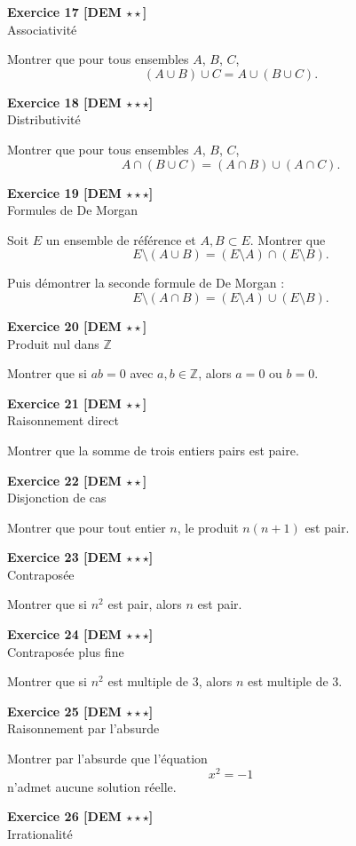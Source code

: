 \documentclass[11pt,a4paper]{article}
\newcommand{\Z}{\mathbb{Z}}
\begin{document}
\textbf{Exercice 17 [DEM \(\star\star\)]}\\
Associativité

Montrer que pour tous ensembles \(A\), \(B\), \(C\),
\[
(A\cup B)\cup C=A\cup(B\cup C).
\]

\textbf{Exercice 18 [DEM \(\star\star\star\)]}\\
Distributivité

Montrer que pour tous ensembles \(A\), \(B\), \(C\),
\[
A\cap(B\cup C)=(A\cap B)\cup(A\cap C).
\]

\textbf{Exercice 19 [DEM \(\star\star\star\)]}\\
Formules de De Morgan

Soit \(E\) un ensemble de référence et \(A,B\subset E\). Montrer que
\[
E\setminus(A\cup B)=(E\setminus A)\cap(E\setminus B).
\]

Puis démontrer la seconde formule de De Morgan :
\[
E\setminus(A\cap B)=(E\setminus A)\cup(E\setminus B).
\]

\textbf{Exercice 20 [DEM \(\star\star\)]}\\
Produit nul dans \(\Z\)

Montrer que si \(ab=0\) avec \(a,b\in\Z\), alors \(a=0\) ou \(b=0\).

\textbf{Exercice 21 [DEM \(\star\star\)]}\\
Raisonnement direct

Montrer que la somme de trois entiers pairs est paire.

\textbf{Exercice 22 [DEM \(\star\star\)]}\\
Disjonction de cas

Montrer que pour tout entier \(n\), le produit \(n(n+1)\) est pair.

\textbf{Exercice 23 [DEM \(\star\star\star\)]}\\
Contraposée

Montrer que si \(n^2\) est pair, alors \(n\) est pair.

\textbf{Exercice 24 [DEM \(\star\star\star\)]}\\
Contraposée plus fine

Montrer que si \(n^2\) est multiple de \(3\), alors \(n\) est multiple de \(3\).

\textbf{Exercice 25 [DEM \(\star\star\star\)]}\\
Raisonnement par l’absurde

Montrer par l’absurde que l’équation
\[
x^2=-1
\]
n’admet aucune solution réelle.

\textbf{Exercice 26 [DEM \(\star\star\star\)]}\\
Irrationalité
\end{document}
